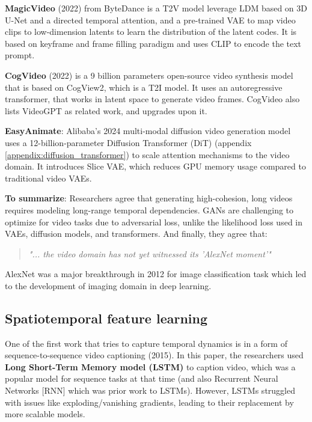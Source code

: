 \textbf{MagicVideo} (2022) \cite{magic_video} from ByteDance is a T2V model leverage LDM based on 3D U-Net and a directed temporal attention, and a pre-trained VAE to map video clips to low-dimension latents to learn the distribution of the latent codes. It is based on keyframe and frame filling paradigm and uses CLIP to encode the text prompt.

\textbf{CogVideo} (2022) \cite{cogvideo} is a 9 billion parameters open-source video synthesis model that is based on CogView2, which is a T2I model. It uses an autoregressive transformer, that works in latent space to generate video frames. CogVideo also lists VideoGPT as related work, and upgrades upon it.

\textbf{EasyAnimate}: Alibaba's 2024 multi-modal diffusion video generation model \cite{easyanimate} uses a 12-billion-parameter Diffusion Transformer (DiT) (appendix \ref{appendix:diffusion_transformer}) to scale attention mechanisms to the video domain. It introduces Slice VAE, which reduces GPU memory usage compared to traditional video VAEs.

\textbf{To summarize}: Researchers agree that generating high-cohesion, long videos requires modeling long-range temporal dependencies. GANs are challenging to optimize for video tasks due to adversarial loss, unlike the likelihood loss used in VAEs, diffusion models, and transformers. And finally, they agree that:

\begin{quote}
    \textit{"... the video domain has not yet witnessed its 'AlexNet moment'"} \cite{tran2018closer}
\end{quote}

AlexNet \cite{alexnet} was a major breakthrough in 2012 for image classification task which led to the development of imaging domain in deep learning.










\subsection{Spatiotemporal feature learning}

One of the first work that tries to capture temporal dynamics is in a form of sequence-to-sequence video captioning \cite{venugopalan2015sequence} (2015). In this paper, the researchers used \textbf{Long Short-Term Memory model (LSTM)} to caption video, which was a popular model for sequence tasks at that time (and also Recurrent Neural Networks [RNN] which was prior work to LSTMs). However, LSTMs struggled with issues like exploding/vanishing gradients, leading to their replacement by more scalable models.

